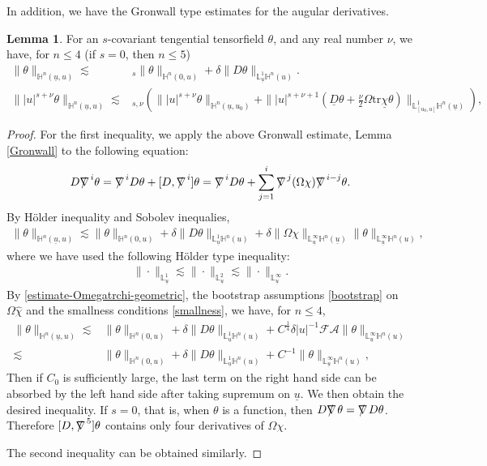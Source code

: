 \documentclass[11pt,reqno]{amsart}
\theoremstyle{definition}
\newtheorem{lemma}{Lemma}[section]
\numberwithin{equation}{section}
\newcommand{\tr}{\mathrm{tr}}
\renewcommand{\L}{\mathbb{L}}
\renewcommand{\H}{\mathbb{H}}
\def\chib{\underline{\chi}}
\def\chih{\widehat{\chi}}
\def\tr{\mathrm{tr}}
\def\ub{\underline{u}}
\newcommand{\Db}{\underline{D}}
\def\nablas{\mbox{$\nabla \mkern -13mu /$ }}
\begin{document}
In addition, we have the Gronwall type estimates for the augular derivatives.
\begin{lemma}\label{Gronwallderivative}
For an $s$-covariant tengential tensorfield $\theta$, and any real number $\nu$, we have, for $n\le4$ (if $s=0$, then $n\le5$)
\begin{align*}
\|\theta\|_{\H^n(\ub,u)}
\lesssim&_{s} \|\theta\|_{\H^n(0,u)}+\delta\|D\theta\|_{\L_{\ub}^1\H^n(u)}.\\
\||u|^{s+\nu}\theta\|_{\H^n(\ub,u)}\lesssim&_{s,\nu}\left(\||u|^{s+\nu}\theta\|_{\H^n(\ub,u_0)}+\||u|^{s+\nu+1}(\Db\theta+\frac{\nu}{2}\Omega\tr\chib\theta)\|_{\L^1_{[u_0,u]}\H^n(\ub)}\right),
\end{align*}
\end{lemma}

\begin{proof}
For the first inequality, we apply the above Gronwall estimate, Lemma \ref{Gronwall} to the following equation:
\begin{align*}
D\nablas^i\theta=\nablas^iD\theta+[D,\nablas^i]\theta=\nablas^iD\theta+\sum_{j=1}^i\nablas^j(\Omega\chi)\nablas^{i-j}\theta.
\end{align*}
By H\"older inequality and Sobolev inequalies,
\begin{align*}
\|\theta\|_{\H^n(\ub,u)}
\lesssim \|\theta\|_{\H^n(0,u)}+\delta\|D\theta\|_{\L_{\ub}^1\H^n(u)}+\delta\|\Omega\chi\|_{\L^\infty_{\ub}\H^n(\ub)}\|\theta\|_{\L^\infty_{\ub}\H^n(u)},
\end{align*}
where we have used the following H\"older type inequality:
\begin{align}\label{Holder-ub}
\|\cdot\|_{\L^1_{\ub}}\lesssim\|\cdot\|_{\L^2_{\ub}}\lesssim\|\cdot\|_{\L^\infty_{\ub}}.
\end{align}
By \eqref{estimate-Omegatrchi-geometric}, the bootstrap assumptions \eqref{bootstrap} on $\Omega\chih$ and the smallness conditions \eqref{smallness}, we have, for $n\le 4$,
\begin{align*}
\|\theta\|_{\H^n(\ub,u)}
\lesssim& \|\theta\|_{\H^n(0,u)}+\delta\|D\theta\|_{\L_{\ub}^1\H^n(u)}+C^{\frac{1}{4}}\delta|u|^{-1}\mathscr{F}\mathcal{A}\|\theta\|_{\L^\infty_{\ub}\H^n(u)}\\
\lesssim& \|\theta\|_{\H^n(0,u)}+\delta\|D\theta\|_{\L_{\ub}^1\H^n(u)}+C^{-1}\|\theta\|_{\L^\infty_{\ub}\H^n(u)},
\end{align*}
Then if $C_0$ is sufficiently large, the last term on the right hand side can be absorbed by the left hand side after taking supremum on $\ub$. We then obtain the desired inequality. If $s=0$, that is, when $\theta$ is a function, then $D\nablas\theta=\nablas D\theta$. Therefore $[D,\nablas^5]\theta$ contains only four derivatives of $\Omega\chi$.

The second inequality can be obtained similarly.
\end{proof}
\end{document}
